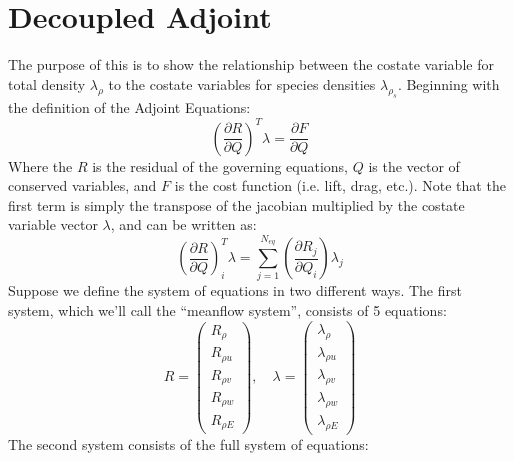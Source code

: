 \documentclass{article}   	%
\begin{document}
\section{Decoupled Adjoint}

The purpose of this is to show the relationship between the costate variable for total density $\lambda_\rho$ to the costate variables for species densities $\lambda_{\rho_s}$. Beginning with the definition of the Adjoint Equations:
\begin{equation}
  \left(\frac{\partial R}{\partial Q}\right)^T\lambda = \frac{\partial F}{\partial Q}
  \label{adj_eqn}
\end{equation}
Where the $R$ is the residual of the governing equations, $Q$ is the vector of conserved variables, and $F$ is the cost function (i.e. lift, drag, etc.). Note that the first term is simply the transpose of the jacobian multiplied by the costate variable vector $\lambda$, and can be written as:
\begin{equation}
  \left(\frac{\partial R}{\partial Q}\right)_i^T \lambda 
  = \sum_{j=1}^{N_{eq}}{
    \left(\frac{\partial R_j}{\partial Q_i}\right) \lambda_j}
  \label{lhs_sum}
\end{equation}
Suppose we define the system of equations in two different ways.  The first system, which we'll call the ``meanflow system'', consists of 5 equations:
\begin{equation}
  R = \begin{pmatrix} 
        R_{\rho} \\ R_{\rho u} \\ R_{\rho v} \\ R_{\rho w} \\ R_{\rho E}
      \end{pmatrix}, \quad
      \lambda = \begin{pmatrix}
        \lambda_\rho \\ \lambda_{\rho u} \\ \lambda_{\rho v} \\ \lambda_{\rho w} \\
        \lambda_{\rho E}
      \end{pmatrix}
  \label{5x5}
\end{equation}
The second system consists of the full system of equations:
\end{document}
